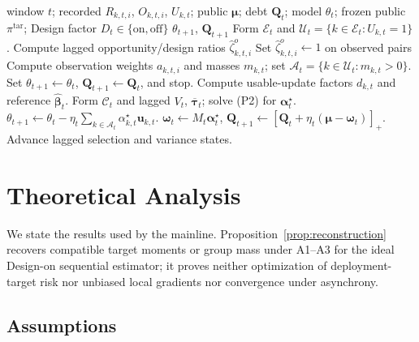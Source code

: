 \documentclass[letterpaper,journal]{IEEEtran}
\begin{document}
\begin{algorithm}[t]
\caption{Window-close RAVEN-MCS with the Design factor as an explicit configuration}
\label{alg:window_close}
\begin{algorithmic}[1]
\REQUIRE window $t$; recorded $R_{k,t,i}$, $O_{k,t,i}$, $U_{k,t}$;
public $\boldsymbol\mu$; debt $\mathbf{Q}_t$; model $\theta_t$;
frozen public $\pi^{\mathrm{tar}}$; Design factor $D_t\in\{\mathrm{on},\mathrm{off}\}$
\ENSURE $\theta_{t+1}$, $\mathbf{Q}_{t+1}$
\STATE Form $\mathcal{E}_t$ and
$\mathcal{U}_t=\{k\in\mathcal{E}_t:U_{k,t}=1\}$.
\STATE Compute lagged opportunity/design ratios
$\widehat\zeta^{o}_{k,t,i}$ 
\ELSE
\STATE Set $\widehat\zeta^{o}_{k,t,i}\leftarrow 1$ on observed pairs 
\ENDIF
\STATE Compute observation weights $a_{k,t,i}$ and masses $m_{k,t}$;
set $\mathcal{A}_t=\{k\in\mathcal{U}_t:m_{k,t}>0\}$.
\STATE Set $\theta_{t+1}\leftarrow\theta_t$,
$\mathbf{Q}_{t+1}\leftarrow\mathbf{Q}_t$, and stop.
\ELSE
\STATE Compute usable-update factors $d_{k,t}$ and reference
$\widehat{\boldsymbol\beta}_t$.
\STATE Form $\mathcal{C}_t$ and lagged $V_t$,
$\overline{\boldsymbol\tau}_t$; solve (P2) for
$\boldsymbol\alpha_t^\star$.
\STATE $\theta_{t+1}\leftarrow\theta_t
-\eta_t\sum_{k\in\mathcal{A}_t}\alpha^\star_{k,t}\mathbf{u}_{k,t}$.
\STATE $\boldsymbol\omega_t\leftarrow M_t\boldsymbol\alpha_t^\star$,
$\mathbf{Q}_{t+1}\leftarrow
[\mathbf{Q}_t+\eta_t(\boldsymbol\mu-\boldsymbol\omega_t)]_+$.
\STATE Advance lagged selection and variance states.
\ENDIF
\end{algorithmic}
\end{algorithm}


\section{Theoretical Analysis}
\label{sec:theory}

We state the results used by the mainline.  Proposition~\ref{prop:reconstruction}
recovers compatible target moments or group mass under A1--A3 for the ideal
Design-on sequential estimator; it proves neither optimization of
deployment-target risk nor unbiased local gradients nor convergence under
asynchrony.

\subsection{Assumptions}
\label{subsec:assumptions}
\end{document}
